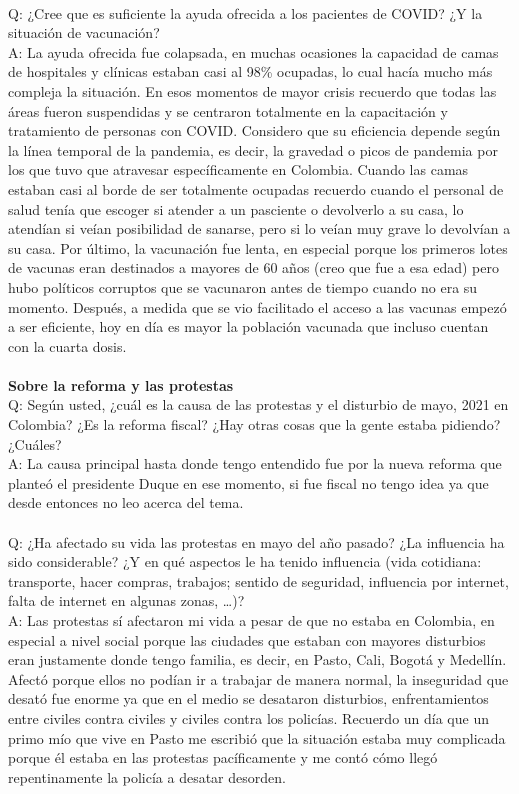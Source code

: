 \documentclass{phyasgn}\usepackage{nag}
\begin{document}
\\
Q: ¿Cree que es suficiente la ayuda ofrecida a los pacientes de COVID? ¿Y la situación de vacunación? \\
A: La ayuda ofrecida fue colapsada, en muchas ocasiones la capacidad de camas de hospitales y clínicas estaban casi al 98\% ocupadas, lo cual hacía mucho más compleja la situación. En esos momentos de mayor crisis recuerdo que todas las áreas fueron suspendidas y se centraron totalmente en la capacitación y tratamiento de personas con COVID. Considero que su eficiencia depende según la línea temporal de la pandemia, es decir, la gravedad o picos de pandemia por los que tuvo que atravesar específicamente en Colombia. Cuando las camas estaban casi al borde de ser totalmente ocupadas recuerdo cuando el personal de salud tenía que escoger si atender a un pasciente o devolverlo a su casa, lo atendían si veían posibilidad de sanarse, pero si lo veían muy grave lo devolvían a su casa. Por último, la vacunación fue lenta, en especial porque los primeros lotes de vacunas eran destinados a mayores de 60 años (creo que fue a esa edad) pero hubo políticos corruptos que se vacunaron antes de tiempo cuando no era su momento. Después, a medida que se vio facilitado el acceso a las vacunas empezó a ser eficiente, hoy en día es mayor la población vacunada que incluso cuentan con la cuarta dosis.\\
\\
\textbf{Sobre la reforma y las protestas}\\
Q: Según usted, ¿cuál es la causa de las protestas y el disturbio de mayo, 2021 en Colombia? ¿Es la reforma fiscal? ¿Hay otras cosas que la gente estaba pidiendo? ¿Cuáles?\\
A: La causa principal hasta donde tengo entendido fue por la nueva reforma que planteó el presidente Duque en ese momento, si fue fiscal no tengo idea ya que desde entonces no leo acerca del tema. \\
\\
Q: ¿Ha afectado su vida las protestas en mayo del año pasado? ¿La influencia ha sido considerable? ¿Y en qué aspectos le ha tenido influencia (vida cotidiana: transporte, hacer compras, trabajos; sentido de seguridad, influencia por internet, falta de internet en algunas zonas, …)?\\
A: Las protestas sí afectaron mi vida a pesar de que no estaba en Colombia, en especial a nivel social porque las ciudades que estaban con mayores disturbios eran justamente donde tengo familia, es decir, en Pasto, Cali, Bogotá y Medellín. Afectó porque ellos no podían ir a trabajar de manera normal, la inseguridad que desató fue enorme ya que en el medio se desataron disturbios, enfrentamientos entre civiles contra civiles y civiles contra los policías. Recuerdo un día que un primo mío que vive en Pasto me escribió que la situación estaba muy complicada porque él estaba en las protestas pacíficamente y me contó cómo llegó repentinamente la policía a desatar desorden.\\
\end{document}
